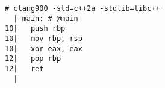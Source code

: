 \begin{lstlisting}[language={},numbers=none,title=\href{https://godbolt.org/z/rso3na}{\texttt{godbolt.org/z/rso3na}}]
# clang900 -std=c++2a -stdlib=libc++
  | main: # @main
10|   push rbp
10|   mov rbp, rsp
10|   xor eax, eax
12|   pop rbp
12|   ret
  |
\end{lstlisting}
